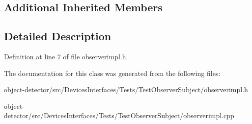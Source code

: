 \subsection*{Additional Inherited Members}


\subsection{Detailed Description}


Definition at line 7 of file observerimpl.\+h.



The documentation for this class was generated from the following files\+:\begin{DoxyCompactItemize}
\item 
object-\/detector/src/\+Devices\+Interfaces/\+Tests/\+Test\+Observer\+Subject/observerimpl.\+h\item 
object-\/detector/src/\+Devices\+Interfaces/\+Tests/\+Test\+Observer\+Subject/observerimpl.\+cpp\end{DoxyCompactItemize}
